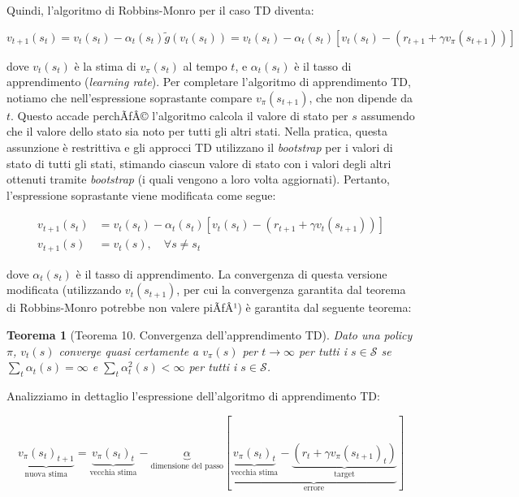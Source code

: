 ﻿\documentclass[11pt, a4paper]{report}
\newtheorem{theorem}{Teorema}
\begin{document}
Quindi, l'algoritmo di Robbins-Monro per il caso TD diventa:

\[
v_{t+1}(s_t) = v_t(s_t) - \alpha_t(s_t)\tilde{g}(v_t(s_t)) = v_t(s_t) - \alpha_t(s_t)[v_t(s_t) - (r_{t+1} + \gamma v_\pi(s_{t+1}))]
\]

dove $v_t(s_t)$ è la stima di $v_\pi(s_t)$ al tempo $t$, e $\alpha_t(s_t)$ è il tasso di apprendimento (\emph{learning rate}). Per completare l'algoritmo di apprendimento TD, notiamo che nell'espressione soprastante compare $v_\pi(s_{t+1})$, che non dipende da $t$. Questo accade perchÃƒÂ© l'algoritmo calcola il valore di stato per $s$ assumendo che il valore dello stato sia noto per tutti gli altri stati. Nella pratica, questa assunzione è restrittiva e gli approcci TD utilizzano il \emph{bootstrap} per i valori di stato di tutti gli stati, stimando ciascun valore di stato con i valori degli altri ottenuti tramite \emph{bootstrap} (i quali vengono a loro volta aggiornati). Pertanto, l'espressione soprastante viene modificata come segue:

\begin{align*}
v_{t+1}(s_t) &= v_t(s_t) - \alpha_t(s_t)[v_t(s_t) - (r_{t+1} + \gamma v_t(s_{t+1}))] \\
v_{t+1}(s) &= v_t(s), \quad \forall s \neq s_t \tag{5.5}
\end{align*}

dove $\alpha_t(s_t)$ è il tasso di apprendimento. La convergenza di questa versione modificata (utilizzando $v_t(s_{t+1})$, per cui la convergenza garantita dal teorema di Robbins-Monro potrebbe non valere piÃƒÂ¹) è garantita dal seguente teorema:

\begin{theorem}[Teorema 10. Convergenza dell'apprendimento TD]
Dato una policy $\pi$, $v_t(s)$ converge quasi certamente a $v_\pi(s)$ per $t \to \infty$ per tutti i $s \in \mathcal{S}$ se $\sum_{t} \alpha_t(s) = \infty$ e $\sum_{t} \alpha_t^2(s) < \infty$ per tutti i $s \in \mathcal{S}$.
\end{theorem}

\newpage

Analizziamo in dettaglio l'espressione dell'algoritmo di apprendimento TD:

\[
\underbrace{v_\pi(s_t)_{t+1}}_{\text{nuova stima}} = \underbrace{v_\pi(s_t)_t}_{\text{vecchia stima}} - \underbrace{\alpha}_{\text{dimensione del passo}} \left[ \underbrace{\underbrace{v_\pi(s_t)_t}_{\text{vecchia stima}} - \underbrace{(r_t + \gamma v_\pi(s_{t+1})_t)}_{\text{target}}}_{\text{errore}} \right] \tag{5.6}
\]
\end{document}
